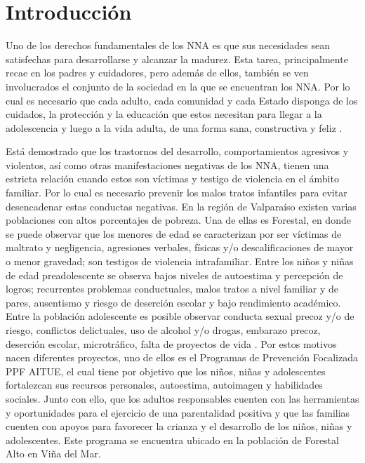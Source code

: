\documentclass[12pt,letterpaper]{article}
\begin{document}
\newpage

\tableofcontents
\newpage

\listoftables
\listoffigures
\newpage



\section{Introducci\'on}
\label{intr}

Uno de los derechos fundamentales de los NNA es que sus necesidades sean satisfechas para desarrollarse y alcanzar la madurez. 
Esta tarea, principalmente recae en los padres y cuidadores, pero además de ellos, también se ven involucrados el conjunto de la sociedad en la que se encuentran los NNA. Por lo cual es necesario que cada adulto, cada comunidad y cada Estado disponga de los cuidados, la protección y la educación que estos necesitan para llegar a la adolescencia y luego a la vida adulta, de una forma sana, constructiva y feliz \cite{REF1}.

Está demostrado \cite{REF2} que los trastornos del desarrollo, comportamientos agresivos y violentos, así como otras manifestaciones negativas de los NNA, tienen una estricta relación cuando estos son víctimas y testigo de violencia en el ámbito familiar. Por lo cual es necesario prevenir los malos tratos infantiles para evitar desencadenar estas conductas negativas. 
En la región de Valparaíso existen varias poblaciones con altos porcentajes de pobreza. Una de ellas es Forestal, en donde se puede observar que los menores de edad se caracterizan por ser víctimas de maltrato y negligencia, agresiones verbales, físicas y/o descalificaciones de mayor o menor gravedad; son testigos de violencia intrafamiliar. Entre los niños y niñas de edad preadolescente se observa bajos niveles de autoestima y percepción de logros; recurrentes problemas conductuales, malos tratos a nivel familiar y de pares, ausentismo y riesgo de deserción escolar y bajo rendimiento académico. Entre la población adolescente es posible observar conducta sexual precoz y/o de riesgo, conflictos delictuales, uso de alcohol y/o drogas, embarazo precoz, deserción escolar, microtráfico,  falta de proyectos de vida \cite{REF3}. 
Por estos motivos nacen diferentes proyectos, uno de ellos es el Programas de Prevención Focalizada PPF AITUE, el cual tiene por objetivo que los niños, niñas y adolescentes fortalezcan sus recursos personales, autoestima, autoimagen y habilidades sociales. Junto con ello, que los adultos responsables cuenten con las herramientas y oportunidades para el ejercicio de una parentalidad positiva y que las familias cuenten con apoyos para favorecer la crianza y el desarrollo de los niños, niñas y adolescentes. 
Este programa se encuentra ubicado en la población de Forestal Alto en Viña del Mar. 
 
\end{document}
